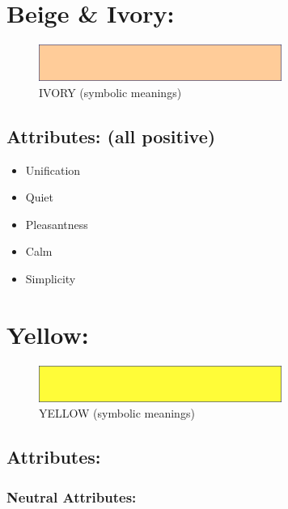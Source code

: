\documentclass[openleft,oneside,showtrims]{memoir}
\begin{document}
\section{Beige \& Ivory:}
\label{sec:org1701258}

\begin{figure}[htbp]
\centering
\includegraphics[width=300px]{./media/beige-ivory-banner.png}
\caption{\label{fig:HAP-WR-003}IVORY (symbolic meanings)}
\end{figure}

\subsection{Attributes: (all positive)}
\label{sec:orgdd7e03c}

\begin{itemize}
\item Unification
\item Quiet
\item Pleasantness
\item Calm
\item Simplicity
\end{itemize}

\section{Yellow:}
\label{sec:org8876b65}

\begin{figure}[htbp]
\centering
\includegraphics[width=300px]{./media/yellow-banner.png}
\caption{\label{fig:HAP-WR-004}YELLOW (symbolic meanings)}
\end{figure}

\subsection{Attributes:}
\label{sec:orgfdf0d50}

\subsubsection*{Neutral Attributes:}
\label{sec:orgecf06a8}
\end{document}
